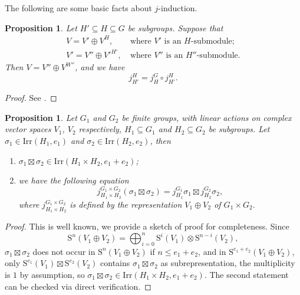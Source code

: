 \documentclass[12pt, a4paper]{amsart}
\numberwithin{equation}{section}
\newtheorem{prop}[thm]{Proposition}
\newcommand{\Irr}{{\mathrm{Irr}}}
\begin{document}
The following are some basic facts about $j$-induction.

\begin{prop}\label{2.5}
    Let $H' \subseteq H \subseteq G$ be subgroups. Suppose that
    \begin{equation}
        \begin{split}
            V = V' \oplus V^H, \ & \textrm{where $V'$ is an $H$-submodule}; \\
            V' = V'' \oplus V'^{H'}, \ & \textrm{where $V''$ is an $H''$-submodule}.
        \end{split}
    \end{equation}
    Then $V = V'' \oplus V^{W''}$, and we have
    \begin{equation}
        j_{H'}^{H} = j_{H}^{G} \circ j_{H'}^{H}.
    \end{equation}
\end{prop}

\begin{proof}
    See \cite[Proposition 11.2.4]{Car}.
\end{proof}

\begin{prop}\label{2.6}
    Let $G_1$ and $G_2$ be finite groups, with linear actions on complex vector spaces $V_1$, $V_2$ respectively, $H_1 \subseteq G_1$ and $H_2 \subseteq G_2$ be subgroups. Let $\sigma_1 \in \Irr(H_1,e_1)$ and $\sigma_2 \in \Irr(H_2,e_2)$, then
    \begin{enumerate}
        \item $\sigma_1 \boxtimes \sigma_2 \in \Irr(H_1 \times H_2,e_1 + e_2)$;
        \item we have the following equation 
            \begin{equation}
            j_{H_1 \times H_2}^{G_1 \times G_2}(\sigma_1 \boxtimes \sigma_2) = j_{H_1}^{G_1}\sigma_1 \boxtimes j_{H_2}^{G_2}\sigma_2,
            \end{equation}
            where $j_{H_1 \times H_2}^{G_1 \times G_2}$ is defined by the representation $V_1 \oplus V_2$ of $G_1 \times G_2$.
    \end{enumerate}
\end{prop}

\begin{proof}
    This is well known, we provide a sketch of proof for completeness.
    Since
    $$\mathrm{S}^{n}(V_1 \oplus V_2) = \bigoplus_{i = 0}^{n}\mathrm{S}^{i}(V_1) \otimes \mathrm{S}^{n-i}(V_2),$$
    $\sigma_1 \boxtimes \sigma_2 $ does not occur in $\mathrm{S}^{n}(V_1 \oplus V_2)$ if $n \leq e_1 + e_2$, and in $\mathrm{S}^{e_1+e_2}(V_1 \oplus V_2)$,
    only $\mathrm{S}^{e_1}(V_1) \boxtimes \mathrm{S}^{e_2}(V_2)$ contains $\sigma_1 \boxtimes \sigma_2$ as subrepresentation, the multiplicity is $1$ by assumption, so $\sigma_1 \boxtimes \sigma_2 \in \Irr(H_1 \times H_2, e_1+e_2)$.
    The second statement can be checked via direct verification.
\end{proof}
\end{document}
